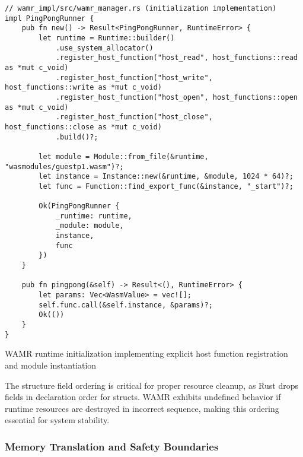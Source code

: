 \begin{listing}[H]
\begin{verbatim}
// wamr_impl/src/wamr_manager.rs (initialization implementation)
impl PingPongRunner {
    pub fn new() -> Result<PingPongRunner, RuntimeError> {
        let runtime = Runtime::builder()
            .use_system_allocator()
            .register_host_function("host_read", host_functions::read as *mut c_void)
            .register_host_function("host_write", host_functions::write as *mut c_void)
            .register_host_function("host_open", host_functions::open as *mut c_void)
            .register_host_function("host_close", host_functions::close as *mut c_void)
            .build()?;

        let module = Module::from_file(&runtime, "wasmodules/guestp1.wasm")?;
        let instance = Instance::new(&runtime, &module, 1024 * 64)?;
        let func = Function::find_export_func(&instance, "_start")?;
        
        Ok(PingPongRunner { 
            _runtime: runtime, 
            _module: module, 
            instance, 
            func 
        })
    }

    pub fn pingpong(&self) -> Result<(), RuntimeError> {
        let params: Vec<WasmValue> = vec![];
        self.func.call(&self.instance, &params)?;
        Ok(())
    }
}
\end{verbatim}
\caption{WAMR runtime initialization implementing explicit host function registration and module instantiation}
\label{lst:wamr-initialization}
\end{listing}

The structure field ordering is critical for proper resource cleanup, as Rust drops fields in declaration order for structs. WAMR exhibits undefined behavior if runtime resources are destroyed in incorrect sequence, making this ordering essential for system stability.

\subsubsection{Memory Translation and Safety Boundaries}

